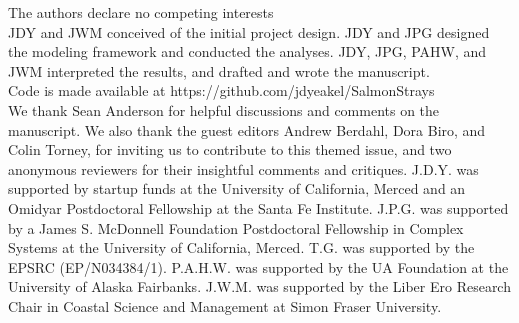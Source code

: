 \documentclass{revtex4}
\begin{document}
 The authors declare no competing interests
\\
 JDY and JWM conceived of the initial project design. JDY and JPG designed the modeling framework and conducted the analyses. JDY, JPG, PAHW, and JWM interpreted the results, and drafted and wrote the manuscript.
\\
 Code is made available at https://github.com/jdyeakel/SalmonStrays
\\
 We thank Sean Anderson for helpful discussions and comments on the manuscript. We also thank the guest editors Andrew Berdahl, Dora Biro, and Colin Torney, for inviting us to contribute to this themed issue, and two anonymous reviewers for their insightful comments and critiques. J.D.Y. was supported by startup funds at the University of California, Merced and an Omidyar Postdoctoral Fellowship at the Santa Fe Institute. J.P.G. was supported by a James S. McDonnell Foundation Postdoctoral Fellowship in Complex Systems at the University of California, Merced. T.G. was supported by the EPSRC (EP/N034384/1). P.A.H.W. was supported by the UA Foundation at the University of Alaska Fairbanks. J.W.M. was supported by the Liber Ero Research Chair in Coastal Science and Management at Simon Fraser University.

% 
\end{document}
